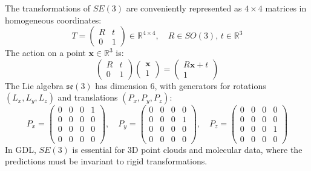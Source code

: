 \begin{example}\label{ex:se3_homogeneas}
The transformations of $SE(3)$ are conveniently represented as $4 \times 4$ matrices in homogeneous coordinates:
\begin{equation}
T = \begin{pmatrix}
R & t \\
0 & 1
\end{pmatrix} \in \mathbb{R}^{4 \times 4}, \quad R \in SO(3), \, t \in \mathbb{R}^3
\end{equation}
The action on a point $\mathbf{x} \in \mathbb{R}^3$ is:
\begin{equation}
\begin{pmatrix}
R & t \\
0 & 1
\end{pmatrix}
\begin{pmatrix}
\mathbf{x} \\
1
\end{pmatrix}
= \begin{pmatrix}
R\mathbf{x} + t \\
1
\end{pmatrix}
\end{equation}
The Lie algebra $\mathfrak{se}(3)$ has dimension 6, with generators for rotations $(L_x, L_y, L_z)$ and translations $(P_x, P_y, P_z)$:
\begin{equation}
P_x = \begin{pmatrix}
0 & 0 & 0 & 1 \\
0 & 0 & 0 & 0 \\
0 & 0 & 0 & 0 \\
0 & 0 & 0 & 0
\end{pmatrix}, \quad
P_y = \begin{pmatrix}
0 & 0 & 0 & 0 \\
0 & 0 & 0 & 1 \\
0 & 0 & 0 & 0 \\
0 & 0 & 0 & 0
\end{pmatrix}, \quad
P_z = \begin{pmatrix}
0 & 0 & 0 & 0 \\
0 & 0 & 0 & 0 \\
0 & 0 & 0 & 1 \\
0 & 0 & 0 & 0
\end{pmatrix}
\end{equation}
In \gls{GDL}, $SE(3)$ is essential for 3D point clouds and molecular data, where the predictions must be invariant to rigid transformations.
\end{example}

